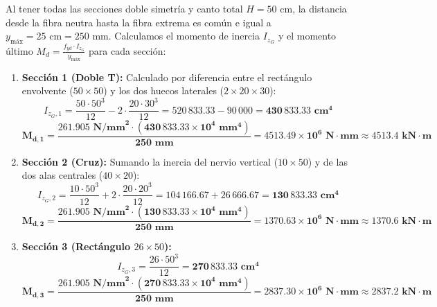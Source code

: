 {    Al tener todas las secciones doble simetría y canto total $H = 50\text{ cm}$, la distancia desde la fibra neutra hasta la fibra extrema es común e igual a $y_{\text{máx}} = 25\text{ cm} = 250\text{ mm}$. Calculamos el momento de inercia $I_{z_G}$ y el momento último $M_d = \frac{f_{yd} \cdot I_{z_G}}{y_{\text{máx}}}$ para cada sección:
    \begin{enumerate}
        \item \textbf{Sección 1 (Doble T):} Calculado por diferencia entre el rectángulo envolvente ($50 \times 50$) y los dos huecos laterales ($2 \times 20 \times 30$):
              \begin{equation}
                  I_{z_G,1} = \frac{50 \cdot 50^3}{12} - 2 \cdot \frac{20 \cdot 30^3}{12} = 520\,833.33 - 90\,000 = \mathbf{430\,833.33\text{ cm}^4}
              \end{equation}
              \begin{equation}
                  \mathbf{M_{d,1} = \frac{261.905\text{ N/mm}^2 \cdot \left(430\,833.33 \times 10^4\text{ mm}^4\right)}{250\text{ mm}} = 4513.49 \times 10^6\text{ N}\cdot\text{mm} \approx 4513.4\text{ kN}\cdot\text{m}}
              \end{equation}

        \item \textbf{Sección 2 (Cruz):} Sumando la inercia del nervio vertical ($10 \times 50$) y de las dos alas centrales ($40 \times 20$):
              \begin{equation}
                  I_{z_G,2} = \frac{10 \cdot 50^3}{12} + 2 \cdot \frac{20 \cdot 20^3}{12} = 104\,166.67 + 26\,666.67 = \mathbf{130\,833.33\text{ cm}^4}
              \end{equation}
              \begin{equation}
                  \mathbf{M_{d,2} = \frac{261.905\text{ N/mm}^2 \cdot \left(130\,833.33 \times 10^4\text{ mm}^4\right)}{250\text{ mm}} = 1370.63 \times 10^6\text{ N}\cdot\text{mm} \approx 1370.6\text{ kN}\cdot\text{m}}
              \end{equation}

        \item \textbf{Sección 3 (Rectángulo $26 \times 50$):}
              \begin{equation}
                  I_{z_G,3} = \frac{26 \cdot 50^3}{12} = \mathbf{270\,833.33\text{ cm}^4}
              \end{equation}
              \begin{equation}
                  \mathbf{M_{d,3} = \frac{261.905\text{ N/mm}^2 \cdot \left(270\,833.33 \times 10^4\text{ mm}^4\right)}{250\text{ mm}} = 2837.30 \times 10^6\text{ N}\cdot\text{mm} \approx 2837.2\text{ kN}\cdot\text{m}}
              \end{equation}
    \end{enumerate}

}
